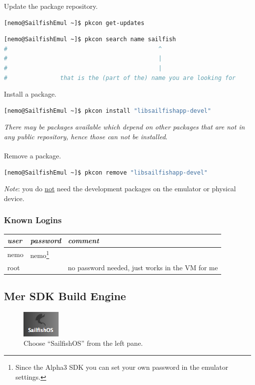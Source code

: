 Update the package repository.
\begin{lstlisting}[language=bash]
[nemo@SailfishEmul ~]$ pkcon get-updates
\end{lstlisting}
%
\begin{lstlisting}[language=bash]
[nemo@SailfishEmul ~]$ pkcon search name sailfish
#                                           ^
#                                           |
#                                           |
#               that is the (part of the) name you are looking for
\end{lstlisting}
%
Install a package.
\begin{lstlisting}[language=bash]
[nemo@SailfishEmul ~]$ pkcon install "libsailfishapp-devel"
\end{lstlisting}
\emph{There may be packages available which depend on other packages that are not in any public repository, hence those can not be installed}.
\\
\\
Remove a package.
\begin{lstlisting}[language=bash]
[nemo@SailfishEmul ~]$ pkcon remove "libsailfishapp-devel"
\end{lstlisting}
%
\emph{Note}: you do \underline{not} need the development packages on the emulator or physical device.
%
\subsubsection{Known Logins}\label{subsubsec:emulatorlogins}
%
\begin{tabular}{lll}
  \emph{user} & \emph{password} & \emph{comment} \\
  \hline 
  nemo & nemo\footnote{Since the Alpha3 SDK you can set your own password in the emulator settings.} &  \\
  root &  & no password needed, just works in the VM for me \\
\end{tabular}
%
%
\subsection{Mer SDK Build Engine}\label{subsec:mersdkpkg}
%
\begin{figure}[H]
  \centering
  \includegraphics[scale=0.4]{../media/gfx/QtCreator/MerSDKsettings.png} 
  \caption{Choose ``SailfishOS'' from the left pane.}
  \label{fig:mersdkpkg:sailfishos}
\end{figure}
%
